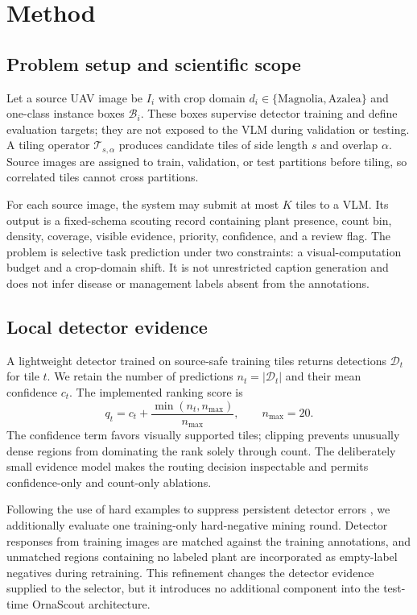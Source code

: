 \section{Method}
\subsection{Problem setup and scientific scope}
Let a source UAV image be $I_i$ with crop domain $d_i\in\{\mathrm{Magnolia},\mathrm{Azalea}\}$ and one-class instance boxes $\mathcal{B}_i$. These boxes supervise detector training and define evaluation targets; they are not exposed to the VLM during validation or testing. A tiling operator $\mathcal{T}_{s,\alpha}$ produces candidate tiles of side length $s$ and overlap $\alpha$. Source images are assigned to train, validation, or test partitions before tiling, so correlated tiles cannot cross partitions.

For each source image, the system may submit at most $K$ tiles to a VLM. Its output is a fixed-schema scouting record containing plant presence, count bin, density, coverage, visible evidence, priority, confidence, and a review flag. The problem is selective task prediction under two constraints: a visual-computation budget and a crop-domain shift. It is not unrestricted caption generation and does not infer disease or management labels absent from the annotations.

\subsection{Local detector evidence}
A lightweight detector trained on source-safe training tiles returns detections $\mathcal{D}_t$ for tile $t$. We retain the number of predictions $n_t=|\mathcal{D}_t|$ and their mean confidence $c_t$. The implemented ranking score is
\begin{equation}
q_t=c_t+\frac{\min(n_t,n_{\max})}{n_{\max}},\qquad n_{\max}=20.
\label{eq:evidence}
\end{equation}
The confidence term favors visually supported tiles; clipping prevents unusually dense regions from dominating the rank solely through count. The deliberately small evidence model makes the routing decision inspectable and permits confidence-only and count-only ablations.

Following the use of hard examples to suppress persistent detector errors \cite{shrivastava2016ohem}, we additionally evaluate one training-only hard-negative mining round. Detector responses from training images are matched against the training annotations, and unmatched regions containing no labeled plant are incorporated as empty-label negatives during retraining. This refinement changes the detector evidence supplied to the selector, but it introduces no additional component into the test-time OrnaScout architecture.

